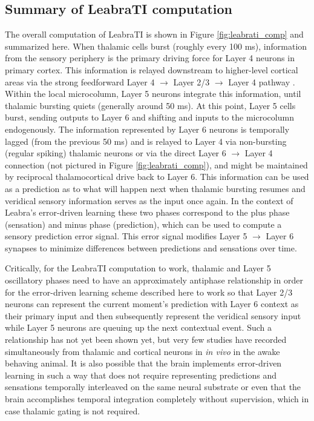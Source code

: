 \documentclass[dwyatte_dissertation.tex]{subfiles}
\begin{document}
\subsection{Summary of LeabraTI computation}
The overall computation of LeabraTI is shown in Figure \ref{fig:leabrati_comp} and summarized here. When thalamic cells burst (roughly every 100 ms), information from the sensory periphery is the primary driving force for Layer 4 neurons in primary cortex. This information is relayed downstream to higher-level cortical areas via the strong feedforward Layer 4 $\rightarrow$ Layer 2/3 $\rightarrow$ Layer 4 pathway \cite{FellemanVanEssen91}. Within the local microcolumn, Layer 5 neurons integrate this information, until thalamic bursting quiets (generally around 50 ms). At this point, Layer 5 cells burst, sending outputs to Layer 6 and shifting and inputs to the microcolumn  endogenously. The information represented by Layer 6 neurons is temporally lagged (from the previous 50 ms) and is relayed to Layer 4 via non-bursting (regular spiking) thalamic neurons or via the direct Layer 6 $\rightarrow$ Layer 4 connection (not pictured in Figure \ref{fig:leabrati_comp}), and might be maintained by reciprocal thalamocortical drive back to Layer 6. This information can be used as a prediction as to what will happen next when thalamic bursting resumes and veridical sensory information serves as the input once again. In the context of Leabra's error-driven learning these two phases correspond to the plus phase (sensation) and minus phase (prediction), which can be used to compute a sensory prediction error signal. This error signal modifies Layer 5 $\rightarrow$ Layer 6 synapses to minimize differences between predictions and sensations over time.

Critically, for the LeabraTI computation to work, thalamic and Layer 5 oscillatory phases need to have an approximately antiphase relationship in order for the error-driven learning scheme described here to work so that Layer 2/3 neurons can represent the current moment's prediction with Layer 6 context as their primary input and then subsequently represent the veridical sensory input while Layer 5 neurons are queuing up the next contextual event. Such a relationship has not yet been shown yet, but very few studies have recorded simultaneously from thalamic and cortical neurons in \textit{in vivo} in the awake behaving animal. It is also possible that the brain implements error-driven learning in such a way that does not require representing predictions and sensations temporally interleaved on the same neural substrate or even that the brain accomplishes temporal integration completely without supervision, which in case thalamic gating is not required.
\end{document}
